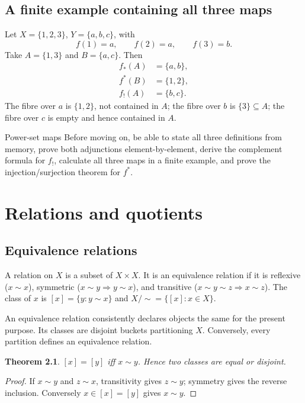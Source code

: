 \documentclass[11pt,openany]{book}
\newtheorem{theorem}{Theorem}[chapter]
\theoremstyle{definition}
\begin{document}
\section{A finite example containing all three maps}
Let $X=\{1,2,3\}$, $Y=\{a,b,c\}$, with
\[
f(1)=a,\qquad f(2)=a,\qquad f(3)=b.
\]
Take $A=\{1,3\}$ and $B=\{a,c\}$. Then
\begin{align*}
f_*(A)&=\{a,b\},\\
f^*(B)&=\{1,2\},\\
f_!(A)&=\{b,c\}.
\end{align*}
The fibre over $a$ is $\{1,2\}$, not contained in $A$; the fibre over $b$ is $\{3\}\subseteq A$; the fibre over $c$ is empty and hence contained in $A$.

\begin{checkpoint}{Power-set maps}
Before moving on, be able to state all three definitions from memory, prove both adjunctions element-by-element, derive the complement formula for $f_!$, calculate all three maps in a finite example, and prove the injection/surjection theorem for $f^*$.
\end{checkpoint}


\chapter{Relations and quotients}
\section{Equivalence relations}
A relation on $X$ is a subset of $X\times X$. It is an equivalence relation if it is reflexive ($x\sim x$), symmetric ($x\sim y\Rightarrow y\sim x$), and transitive ($x\sim y\sim z\Rightarrow x\sim z$). The class of $x$ is $[x]=\{y:y\sim x\}$ and $X/{\sim}=\{[x]:x\in X\}$.
\begin{intuition}An equivalence relation consistently declares objects the same for the present purpose. Its classes are disjoint buckets partitioning $X$. Conversely, every partition defines an equivalence relation.\end{intuition}
\begin{theorem}$[x]=[y]$ iff $x\sim y$. Hence two classes are equal or disjoint.\end{theorem}
\begin{proof}If $x\sim y$ and $z\sim x$, transitivity gives $z\sim y$; symmetry gives the reverse inclusion. Conversely $x\in[x]=[y]$ gives $x\sim y$.\end{proof}
\end{document}
